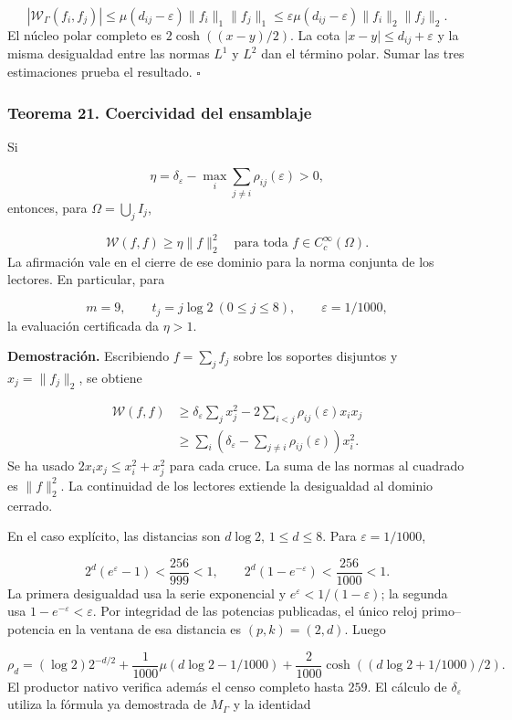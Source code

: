 \[
|\mathscr W_\Gamma(f_i,f_j)|
\leq\mu(d_{ij}-\varepsilon)\|f_i\|_1\|f_j\|_1
\leq\varepsilon\mu(d_{ij}-\varepsilon)\|f_i\|_2\|f_j\|_2.
\]
El núcleo polar completo es \(2\cosh((x-y)/2)\). La cota \(|x-y|\leq d_{ij}+\varepsilon\) y la misma desigualdad entre las normas \(L^1\) y \(L^2\) dan el término polar. Sumar las tres estimaciones prueba el resultado. \hfill\(\square\)

\subsubsection*{Teorema 21. Coercividad del ensamblaje}
Si

\[
\eta=\delta_\varepsilon-
\max_i\sum_{j\neq i}\rho_{ij}(\varepsilon)>0,
\]
entonces, para \(\Omega=\bigcup_j I_j\),

\[
\boxed{\mathscr W(f,f)\geq\eta\|f\|_2^2
\quad\text{para toda }f\in C_c^\infty(\Omega).}
\]
La afirmación vale en el cierre de ese dominio para la norma conjunta de los lectores. En particular, para

\[
m=9,\qquad t_j=j\log2\ (0\leq j\leq8),\qquad
\varepsilon=1/1000,
\]
la evaluación certificada da \(\eta>1\).

\textbf{Demostración.} Escribiendo \(f=\sum_jf_j\) sobre los soportes disjuntos y \(x_j=\|f_j\|_2\), se obtiene

\[
\begin{aligned}
\mathscr W(f,f)&\geq
\delta_\varepsilon\sum_jx_j^2
-2\sum_{i<j}\rho_{ij}(\varepsilon)x_ix_j\\
&\geq\sum_i\left(\delta_\varepsilon-
\sum_{j\neq i}\rho_{ij}(\varepsilon)\right)x_i^2.
\end{aligned}
\]
Se ha usado \(2x_ix_j\leq x_i^2+x_j^2\) para cada cruce. La suma de las normas al cuadrado es \(\|f\|_2^2\). La continuidad de los lectores extiende la desigualdad al dominio cerrado.

En el caso explícito, las distancias son \(d\log2\), \(1\leq d\leq8\). Para \(\varepsilon=1/1000\),

\[
2^d(e^\varepsilon-1)<\frac{256}{999}<1,
\qquad 2^d(1-e^{-\varepsilon})<\frac{256}{1000}<1.
\]
La primera desigualdad usa la serie exponencial y \(e^\varepsilon<1/(1-\varepsilon)\); la segunda usa \(1-e^{-\varepsilon}<\varepsilon\). Por integridad de las potencias publicadas, el único reloj primo–potencia en la ventana de esa distancia es \((p,k)=(2,d)\). Luego

\[
\rho_d=(\log2)2^{-d/2}
+\frac1{1000}\mu(d\log2-1/1000)
+\frac2{1000}\cosh((d\log2+1/1000)/2).
\]
El productor nativo verifica además el censo completo hasta \(259\). El cálculo de \(\delta_\varepsilon\) utiliza la fórmula ya demostrada de \(M_\Gamma\) y la identidad

